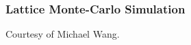 \documentclass{beamer}
\begin{document}


\begin{frame}
  \frametitle{Lattice Monte-Carlo Simulation}
  Courtesy of Michael Wang.
\end{frame}




\end{document}
